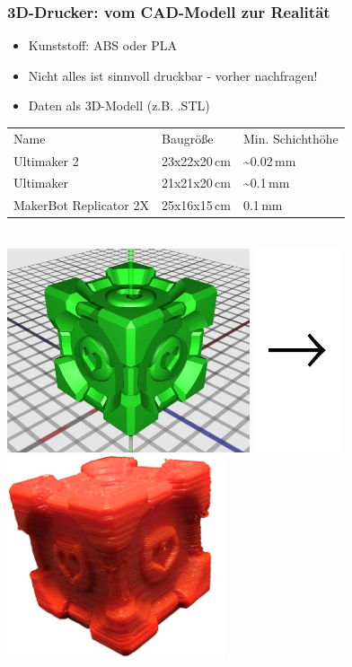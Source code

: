 \documentclass[t]{beamer}
\begin{document}
\begin{frame}
	\frametitle{3D-Drucker: vom CAD-Modell zur Realität}
	\begin{itemize}
		\item Kunststoff: ABS oder PLA
		\item Nicht alles ist sinnvoll druckbar - vorher nachfragen!
		\item Daten als 3D-Modell (z.B. .STL)
	\end{itemize}
	\bigskip
	\begin{tabular}{lll}
		{\color{faublue} Name} & {\color{faublue} Baugröße} & {\color{faublue} Min. Schichthöhe}\\
        Ultimaker 2 & 23x22x20\,cm & \textasciitilde0.02\,mm \\
		Ultimaker & 21x21x20\,cm & \textasciitilde0.1\,mm \\
		MakerBot Replicator 2X & 25x16x15\,cm & 0.1\,mm \\
	\end{tabular}
	\bigskip
	\begin{center}
	~\\
		\includegraphics[height=6cm]{../img/companioncube_render.png}
		\includegraphics[height=6cm]{../img/pfeil.pdf}
		\includegraphics[height=6cm]{../img/companioncube.png}
	\end{center}
\end{frame}
\end{document}
